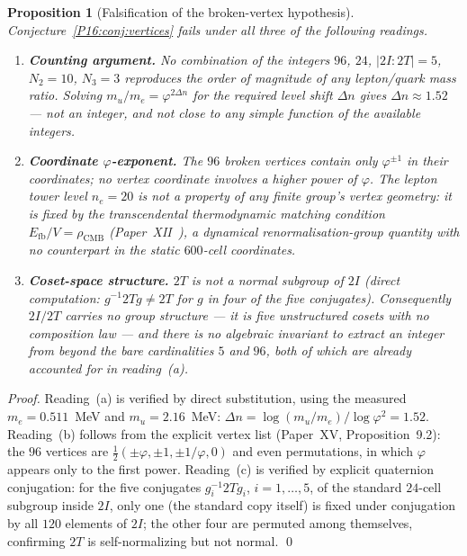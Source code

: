 \documentclass[11pt,a4paper]{article}
\newtheorem{proposition}[theorem]{Proposition}
\theoremstyle{definition}\newtheorem{definition}[theorem]{Definition}
\theoremstyle{remark}
\theoremstyle{definition}\newtheorem{construction}[theorem]{Construction}
\newcommand{\vp}{\varphi}
\newcommand{\rCMB}{\rho_{\mathrm{CMB}}}
\newcommand{\Efb}{E_{\mathrm{fb}}}
\newcommand{\twoI}{2I}
\newcommand{\twoT}{2T}
\begin{document}
\begin{proposition}[Falsification of the broken-vertex hypothesis]
\label{P16:prop:vertices_fail}
Conjecture~\ref{P16:conj:vertices} fails under all three of the following
readings.
\begin{enumerate}[label=(\alph*)]
\item \textbf{Counting argument.} No combination of the integers
  $96$, $24$, $|\twoI{:}\twoT|=5$, $N_2=10$, $N_3=3$ reproduces the
  order of magnitude of any lepton/quark mass ratio. Solving
  $m_u/m_e=\vp^{2\Delta n}$ for the required level shift $\Delta n$
  gives $\Delta n\approx1.52$ --- not an integer, and not close to
  any simple function of the available integers.
\item \textbf{Coordinate $\vp$-exponent.} The $96$ broken vertices
  contain only $\vp^{\pm1}$ in their coordinates; no vertex coordinate
  involves a higher power of $\vp$. The lepton tower level $n_e=20$ is
  not a property of any finite group's vertex geometry: it is fixed by
  the transcendental thermodynamic matching condition
  $\Efb/V=\rCMB$ (Paper~XII~\cite{Paper12}), a dynamical
  renormalisation-group quantity with no counterpart in the static
  $600$-cell coordinates.
\item \textbf{Coset-space structure.} $\twoT$ is not a normal subgroup
  of $\twoI$ (direct computation: $g^{-1}\twoT g\neq\twoT$ for $g$ in
  four of the five conjugates). Consequently $\twoI/\twoT$ carries no
  group structure --- it is five unstructured cosets with no
  composition law --- and there is no algebraic invariant to extract
  an integer from beyond the bare cardinalities $5$ and $96$, both of
  which are already accounted for in reading~(a).
\end{enumerate}
\end{proposition}

\begin{proof}
Reading~(a) is verified by direct substitution, using the measured
$m_e=0.511$~MeV and $m_u=2.16$~MeV: $\Delta n=
\log(m_u/m_e)/\log\vp^2=1.52$. Reading~(b) follows from the explicit
vertex list (Paper~XV, Proposition~9.2): the $96$ vertices are
$\tfrac12(\pm\vp,\pm1,\pm1/\vp,0)$ and even permutations, in which
$\vp$ appears only to the first power. Reading~(c) is verified by
explicit quaternion conjugation: for the five conjugates
$g_i^{-1}\twoT g_i$, $i=1,\dots,5$, of the standard $24$-cell subgroup
inside $\twoI$, only one (the standard copy itself) is fixed under
conjugation by all $120$ elements of $\twoI$; the other four are
permuted among themselves, confirming $\twoT$ is self-normalizing but
not normal.
\qed
\end{proof}
\end{document}
